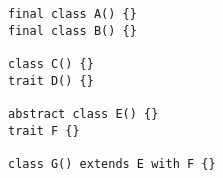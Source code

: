 \begin{lstlisting}[style=reclojureScala]
final class A() {}
final class B() {}

class C() {}
trait D() {}

abstract class E() {}
trait F {}

class G() extends E with F {}
\end{lstlisting}
